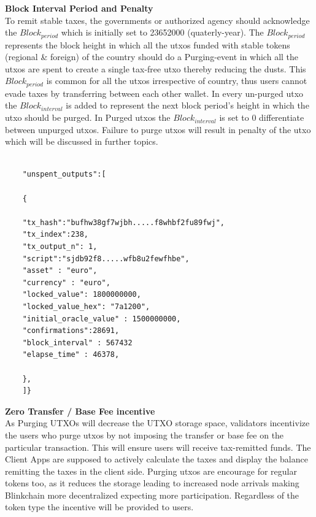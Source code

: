 \documentclass[letterpaper,11pt]{article}
\begin{document}
\textbf{Block Interval Period and Penalty}\\

To remit stable taxes, the governments or authorized agency should acknowledge the $Block_{period}$ which is initially set to 23652000 (quaterly-year). The $Block_{period}$ represents the block height in which all the utxos funded with stable tokens (regional \& foreign) of the country should do a Purging-event in which all the utxos are spent to create a single tax-free utxo thereby reducing the dusts. This $Block_{period}$ is common for all the utxos irrespective of country, thus users cannot evade taxes by transferring between each other wallet. In every un-purged utxo the $Block_{interval}$ is added to represent the next block period's height in which the utxo should be purged. In Purged utxos the $Block_{interval}$ is set to 0 differentiate between unpurged utxos. Failure to purge utxos will result in penalty of the utxo which will be discussed in further topics.\\


\begin{lstlisting}[caption={Blinkchain Type 2 UTXO JSON Object Data}, numbers=none]

    "unspent_outputs":[
    
	{
	
	"tx_hash":"bufhw38gf7wjbh.....f8whbf2fu89fwj",
	"tx_index":238,
	"tx_output_n": 1,
	"script":"sjdb92f8.....wfb8u2fewfhbe",
	"asset" : "euro",
	"currency" : "euro",
	"locked_value": 1800000000,
	"locked_value_hex": "7a1200",
	"initial_oracle_value" : 1500000000,
	"confirmations":28691,
	"block_interval" : 567432
	"elapse_time" : 46378,
	
	},
	]}
\end{lstlisting}


\textbf{Zero Transfer / Base Fee incentive}\\

As Purging UTXOs will decrease the UTXO storage space, validators incentivize the users who purge utxos by not imposing the transfer or base fee on the particular transaction. This will ensure users will receive tax-remitted funds. The Client Apps are supposed to actively calculate the taxes and display the balance remitting the taxes in the client side. Purging utxos are encourage for regular tokens too, as it reduces the storage leading to increased node arrivals making Blinkchain more decentralized expecting more participation. Regardless of the token type the incentive will be provided to users.\\
\end{document}
